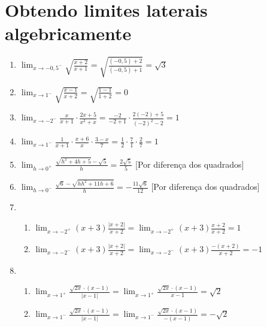 \documentclass[a4paper, 12pt]{article}
\begin{document}
\newpage
\section*{Obtendo limites laterais algebricamente}

\begin{enumerate}\addtocounter{enumi}{10}
    \item $\lim_{x \to -0,5^-} \sqrt{\frac{x+2}{x+1}} = \sqrt{\frac{(-0,5)+2}{(-0,5)+1}} = \sqrt{3}$
    \item $\lim_{x \to 1^-} \sqrt{\frac{x-1}{x+2}} = \sqrt{\frac{1-1}{1+2}} = 0$
    \item $\lim_{x \to -2^-} \frac{x}{x+1} \cdot \frac{2x+5}{x^2 + x} = \frac{-2}{-2+1} \cdot \frac{2(-2)+5}{(-2)^2 -2} = 1$
    \item $\lim_{x \to 1^-} \frac{1}{x+1} \cdot \frac{x+6}{x} \cdot \frac{3-x}{7} = \frac{1}{2} \cdot \frac{7}{1} \cdot \frac{2}{7} = 1$
    \item $\lim_{h \to 0^+} \frac{\sqrt{h^2 + 4h + 5} - \sqrt{5}}{h} = \frac{2\sqrt{5}}{5}$ [Por diferença dos quadrados]
    \item $\lim_{h \to 0^-} \frac{\sqrt{6} - \sqrt{hh^2 +11h + 6}}{h} = -\frac{11\sqrt{6}}{12}$ [Por diferença dos quadrados]
    \item 
    \begin{enumerate}
        \item $\lim_{x \to -2^+} (x+3) \frac{|x+2|}{x+2} = \lim_{x \to -2^+} (x+3) \frac{x+2}{x+2} = 1$
        \item $\lim_{x \to -2^-} (x+3) \frac{|x+2|}{x+2} = \lim_{x \to -2^-} (x+3) \frac{-(x+2)}{x+2} = -1$
    \end{enumerate}
    \item 
    \begin{enumerate}
        \item $\lim_{x \to 1^+} \frac{\sqrt{2x} \cdot (x-1)}{|x-1|} = \lim_{x \to 1^+} \frac{\sqrt{2x} \cdot (x-1)}{x-1} = \sqrt{2}$
        \item $\lim_{x \to 1^-} \frac{\sqrt{2x} \cdot (x-1)}{|x-1|} = \lim_{x \to 1^-} \frac{\sqrt{2x} \cdot (x-1)}{-(x-1)} = -\sqrt{2}$
    \end{enumerate}
\end{enumerate}

\newpage
\end{document}
